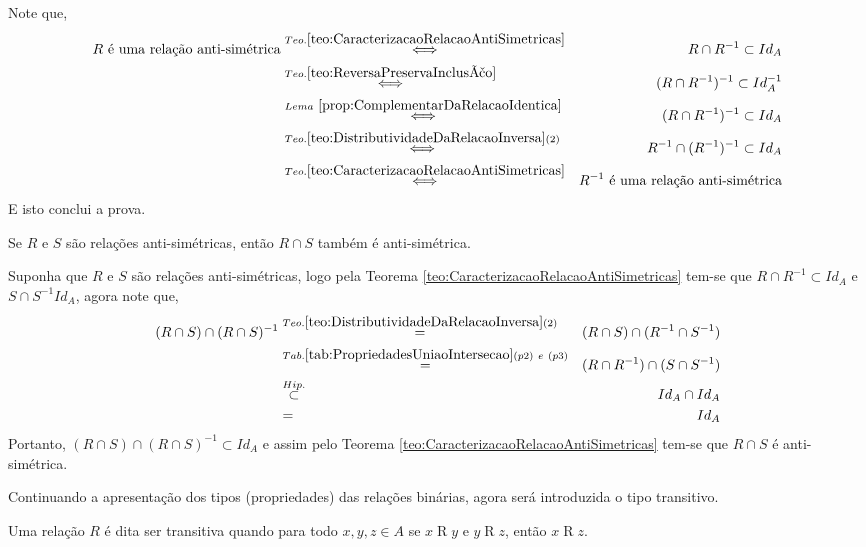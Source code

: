 \begin{prova}
	Note que,
	\begin{eqnarray*}
		R \text{ é uma relação anti-simétrica} & \stackrel{Teo. \ref{teo:CaracterizacaoRelacaoAntiSimetricas}}{\Longleftrightarrow }& R \cap R^{-1} \subset Id_A\\
		& \stackrel{Teo. \ref{teo:ReversaPreservaInclusão}}{\Longleftrightarrow} & 		 (R \cap R^{-1})^{-1} \subset Id_A^{-1}\\
		& \stackrel{Lema \ \ref{prop:ComplementarDaRelacaoIdentica}}{\Longleftrightarrow} & (R \cap R^{-1})^{-1} \subset Id_A\\
		& \stackrel{Teo. \ref{teo:DistributividadeDaRelacaoInversa}(2)}{\Longleftrightarrow} & R^{-1} \cap (R^{-1})^{-1} \subset Id_A\\
		& \stackrel{Teo. \ref{teo:CaracterizacaoRelacaoAntiSimetricas}}{\Longleftrightarrow }& R^{-1} \text{ é uma relação anti-simétrica} 
	\end{eqnarray*}
	E isto conclui a prova.
\end{prova}

\begin{teorema}
	Se $R$ e $S$ são relações anti-simétricas, então $R \cap S$ também é anti-simétrica.
\end{teorema}

\begin{prova}
	Suponha que $R$ e $S$ são relações anti-simétricas, logo pela Teorema \ref{teo:CaracterizacaoRelacaoAntiSimetricas} tem-se que $R \cap R^{-1} \subset Id_A$ e $S \cap S^{-1} Id_A$, agora note que,
	\begin{eqnarray*}
		(R \cap S) \cap (R \cap S)^{-1} & \stackrel{Teo. \ref{teo:DistributividadeDaRelacaoInversa}(2)}{=} & (R \cap S) \cap (R^{-1} \cap S^{-1})\\
		& \stackrel{Tab. \ref{tab:PropriedadesUniaoIntersecao}(p2) \ e \ (p3)}{=} & (R \cap R^{-1}) \cap (S \cap S^{-1})\\
		& \stackrel{Hip.}{\subset} & Id_A \cap Id_A\\
		& = & Id_A
	\end{eqnarray*}
	Portanto, $(R \cap S) \cap (R \cap S)^{-1} \subset Id_A$ e assim pelo Teorema \ref{teo:CaracterizacaoRelacaoAntiSimetricas} tem-se que $R \cap S$ é anti-simétrica.
\end{prova}

Continuando a apresentação dos tipos (propriedades) das relações binárias, agora será introduzida o tipo transitivo.

\begin{definicao}\label{def:RelacaoTransitiva}
	Uma relação $R$ é dita ser transitiva quando para todo $x, y, z \in A$ se $x \mathrel{R} y$ e $y \mathrel{R} z$, então $x \mathrel{R} z$.
\end{definicao}

